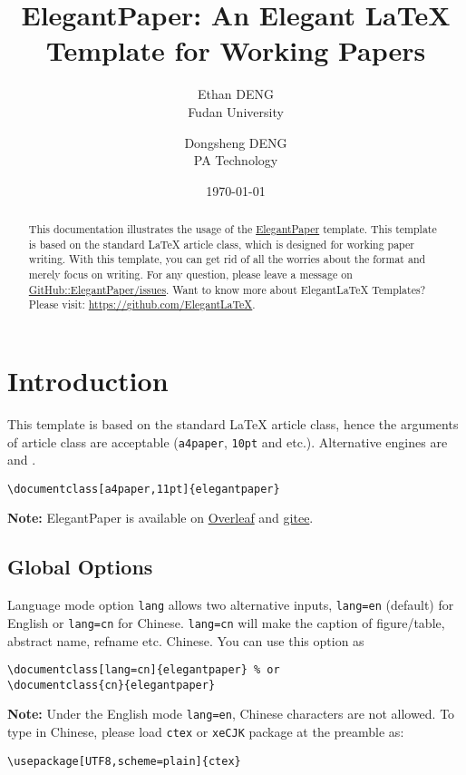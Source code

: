 \documentclass[11pt,en,cite=authoryear]{elegantpaper}
\title{ElegantPaper: An Elegant \LaTeX{} Template for Working Papers}
\author{Ethan DENG \\ Fudan University \and Dongsheng DENG \\ PA Technology}
\institute{\href{https://github.com/ElegantLaTeX}{Elegant\LaTeX{} Program}}
\date{\today}
\begin{document}
\maketitle

\begin{abstract}
This documentation illustrates the usage of the \href{https://github.com/ElegantLaTeX/ElegantPaper}{ElegantPaper} template. This template is based on the standard \LaTeX{} article class, which is designed for working paper writing. With this template, you can get rid of all the worries about the format and merely focus on writing. For any question, please leave a message on \href{https://github.com/ElegantLaTeX/ElegantPaper/issues}{GitHub::ElegantPaper/issues}. Want to know more about Elegant\LaTeX{} Templates? Please visit: \href{https://github.com/ElegantLaTeX}{https://github.com/ElegantLaTeX}.\par
{}
\end{abstract}


\section{Introduction}

This template is based on the standard \LaTeX{} article class, hence the arguments of article class are acceptable (\lstinline{a4paper}, \lstinline{10pt} and etc.). Alternative engines are  and .
\begin{lstlisting}
\documentclass[a4paper,11pt]{elegantpaper}
\end{lstlisting}
\textbf{Note:} ElegantPaper is available on  \href{https://www.overleaf.com/latex/templates/elegantpaper-template/yzghrqjhmmmr}{Overleaf} and \href{https://gitee.com/ElegantLaTeX/ElegantPaper}{gitee}.

\subsection{Global Options}
Language mode option \lstinline{lang} allows two alternative inputs, \lstinline{lang=en} (default)  for English or \lstinline{lang=cn} for Chinese. \lstinline{lang=cn} will make the caption of figure/table, abstract name, refname etc. Chinese. You can use this option as
\begin{lstlisting}
\documentclass[lang=cn]{elegantpaper} % or
\documentclass{cn}{elegantpaper} 
\end{lstlisting}
\textbf{Note:} Under the English mode \lstinline{lang=en}, Chinese characters are not allowed. To type in Chinese, please load  \lstinline{ctex} or \lstinline{xeCJK} package at the preamble as:
\begin{lstlisting}
\usepackage[UTF8,scheme=plain]{ctex}
\end{lstlisting}
\end{document}
